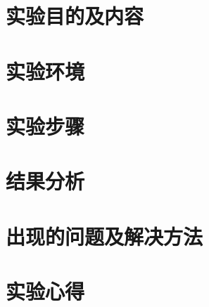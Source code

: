 \documentclass{whureport}
\begin{document}
\thispagestyle{empty}
\tableofcontents
\makeheader
\setcounter{page}{1}


\section{实验目的及内容}
\section{实验环境}
\section{实验步骤}
\section{结果分析}
\section{出现的问题及解决方法}
\section{实验心得}

\small

\end{document}
